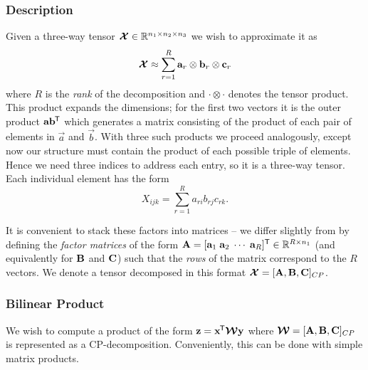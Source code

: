 \subsubsection{Description}
Given a three-way tensor \(\bm{\mathcal{X}} \in \mathbb{R}^{n_1 \times n_2 \times n_3}\) we wish to 
approximate it as
\begin{equation}\label{eq:cp-statement}
	\bm{\mathcal{X}} \approx \sum_{r=1}^{R} \mathbf{a}_r \otimes \mathbf{b}_r \otimes \mathbf{c}_r
\end{equation}
 where \(R\) is the \emph{rank} of the decomposition and \(\cdot \otimes \cdot\) denotes the tensor
product. This product expands the dimensions; for the first two vectors it is the outer product
\(\mathbf{a}\mathbf{b}^{\mkern-1.5mu\mathsf{T}}\) which generates a matrix consisting of the product of each pair of
elements in \(\vec{a}\) and \(\vec{b}\). With three such products we proceed analogously, except
now our structure must contain the product of each possible triple of elements. Hence we need
three indices to address each entry, so it is a three-way tensor. Each individual
element has the form
\begin{equation}\label{eq:cp-element}
	X_{ijk} = \sum_{r=1}^R a_{ri}b_{rj}c_{rk}.
\end{equation}

It is convenient to stack these factors into matrices --
we differ slightly from \autocite{Kolda2009} by defining the \textit{factor matrices} of the 
form \(\mathbf{A} = [\mathbf{a}_1\;\mathbf{a}_2\;\cdots\;\mathbf{a}_R]^{\mathsf{T}} \in 
\mathbb{R}^{R\times n_1}\) (and equivalently for
\(\mathbf{B}\) and \(\mathbf{C}\)) such that the  \textit{rows} of the matrix correspond to the
\(R\) vectors. 
We denote a tensor decomposed in this format 
\(\bm{\mathcal{X}} = [\mathbf{A}, \mathbf{B}, \mathbf{C}]_{CP}\).

\subsubsection{Bilinear Product}
We wish to compute a product of the form \(\mathbf{z} = \mathbf{x}^{\mkern-1.5mu\mathsf{T}}\bm{\mathcal{W}}\mathbf{y}\)
where \(\bm{\mathcal{W}} = [\mathbf{A}, \mathbf{B}, \mathbf{C}]_{CP}\) is represented as a CP-decomposition.
Conveniently, this can be done with simple matrix products.

